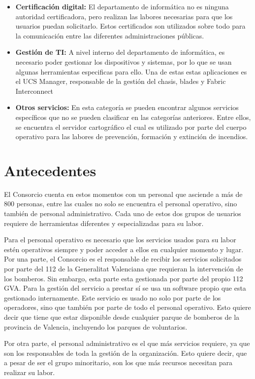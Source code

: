 \documentclass[12pt,a4paper,titlepage,twoside]{report}
\begin{document}
\begin{itemize}
\item \textbf{Certificación digital:} El departamento de informática no es ninguna autoridad certificadora, pero realizan las labores necesarias para que los usuarios puedan solicitarlo. Estos certificados son utilizados sobre todo para la comunicación entre las diferentes administraciones públicas.
\item \textbf{Gestión de TI:} A nivel interno del departamento de informática, es necesario poder gestionar los dispositivos y sistemas, por lo que se usan algunas herramientas especificas para ello. Una de estas estas aplicaciones es el UCS Manager, responsable de la gestión del chasis, blades y Fabric Interconnect
\item \textbf{Otros servicios:} En esta categoría se pueden encontrar algunos servicios específicos que no se pueden clasificar en las categorías anteriores. Entre ellos, se encuentra el servidor cartográfico el cual es utilizado por parte del cuerpo operativo para las labores de prevención, formación y extinción de incendios. 
\end{itemize}

\chapter{Antecedentes}
El Consorcio cuenta en estos momentos con un personal que asciende a más de 800 personas, entre las cuales no solo se encuentra el personal operativo, sino también de personal administrativo. Cada uno de estos dos grupos de usuarios requiere de herramientas diferentes y especializadas para su labor. 
\par
Para el personal operativo es necesario que los servicios usados para su labor estén operativos siempre y poder acceder a ellos en cualquier momento y lugar. Por una parte, el Consorcio es el responsable de recibir los servicios solicitados por parte del 112 de la Generalitat Valenciana que requieran la intervención de los bomberos. Sin embargo, esta parte esta gestionada por parte del propio 112 GVA. Para la gestión del servicio a prestar sí se usa un software propio que esta gestionado internamente. Este servicio es usado no solo por parte de los operadores, sino que también por parte de todo el personal operativo. Esto quiere decir que tiene que estar disponible desde cualquier parque de bomberos de la provincia de Valencia, incluyendo los parques de voluntarios.
\par
Por otra parte, el personal administrativo es el que más servicios requiere, ya que son los responsables de toda la gestión de la organización. Esto quiere decir, que a pesar de ser el grupo minoritario, son los que más recursos necesitan para realizar su labor.
\end{document}
